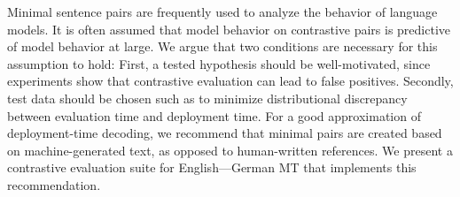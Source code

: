 Minimal sentence pairs are frequently used to analyze the behavior of language models. It is often assumed that model behavior on contrastive pairs is predictive of model behavior at large. We argue that two conditions are necessary for this assumption to hold: First, a tested hypothesis should be well-motivated, since experiments show that contrastive evaluation can lead to false positives. Secondly, test data should be chosen such as to minimize distributional discrepancy between evaluation time and deployment time. For a good approximation of deployment-time decoding, we recommend that minimal pairs are created based on machine-generated text, as opposed to human-written references. We present a contrastive evaluation suite for English---German MT that implements this recommendation.
